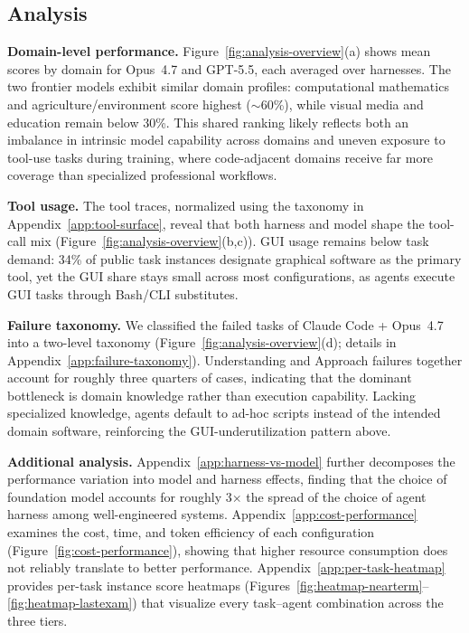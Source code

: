 \documentclass{llmxive}
\begin{document}
\subsection{Analysis}
\label{sec:experiment-analysis}
\noindent \textbf{Domain-level performance.}
Figure~\ref{fig:analysis-overview}(a) shows mean scores by domain for Opus~4.7 and GPT-5.5, each averaged over harnesses.
The two frontier models exhibit similar domain profiles: computational mathematics and agriculture/environment score highest (${\sim}$60\%), while visual media and education remain below 30\%.
This shared ranking likely reflects both an imbalance in intrinsic model capability across domains and uneven exposure to tool-use tasks during training, where code-adjacent domains receive far more coverage than specialized professional workflows.

\noindent \textbf{Tool usage.}
The tool traces, normalized using the taxonomy in Appendix~\ref{app:tool-surface}, reveal that both harness and model shape the tool-call mix (Figure~\ref{fig:analysis-overview}(b,c)).
GUI usage remains below task demand: 34\% of public task instances designate graphical software as the primary tool, yet the GUI share stays small across most configurations, as agents execute GUI tasks through Bash/CLI substitutes.

\noindent \textbf{Failure taxonomy.}
We classified the failed tasks of Claude Code + Opus~4.7 into a two-level taxonomy (Figure~\ref{fig:analysis-overview}(d); details in Appendix~\ref{app:failure-taxonomy}).
Understanding and Approach failures together account for roughly three quarters of cases, indicating that the dominant bottleneck is domain knowledge rather than execution capability.
Lacking specialized knowledge, agents default to ad-hoc scripts instead of the intended domain software, reinforcing the GUI-underutilization pattern above.

\noindent \textbf{Additional analysis.}
Appendix~\ref{app:harness-vs-model} further decomposes the performance variation into model and harness effects, finding that the choice of foundation model accounts for roughly 3$\times$ the spread of the choice of agent harness among well-engineered systems.
Appendix~\ref{app:cost-performance} examines the cost, time, and token efficiency of each configuration (Figure~\ref{fig:cost-performance}), showing that higher resource consumption does not reliably translate to better performance.
Appendix~\ref{app:per-task-heatmap} provides per-task instance score heatmaps (Figures~\ref{fig:heatmap-nearterm}--\ref{fig:heatmap-lastexam}) that visualize every task--agent combination across the three tiers.
\end{document}
